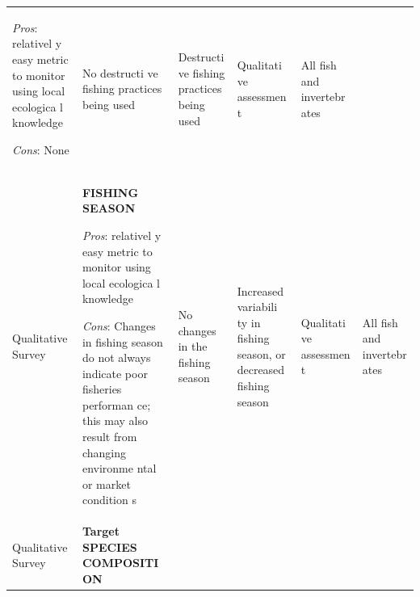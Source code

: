 \documentclass[]{book}
\begin{document}
\begin{longtable}[]{@{}llllll@{}}
\begin{minipage}[t]{0.16\columnwidth}
\emph{Pros}: relativel y easy metric to monitor using local ecologica l
knowledge

\emph{Cons}: None\strut
\end{minipage} & \begin{minipage}[t]{0.16\columnwidth}\raggedright\strut
No destructi ve fishing practices being used\strut
\end{minipage} & \begin{minipage}[t]{0.16\columnwidth}\raggedright\strut
Destructi ve fishing practices being used\strut
\end{minipage} & \begin{minipage}[t]{0.16\columnwidth}\raggedright\strut
Qualitati ve assessmen t\strut
\end{minipage} & \begin{minipage}[t]{0.16\columnwidth}\raggedright\strut
All fish and invertebr ates\strut
\end{minipage}\tabularnewline
\begin{minipage}[t]{0.16\columnwidth}\raggedright\strut
Qualitative Survey\strut
\end{minipage} & \begin{minipage}[t]{0.16\columnwidth}\raggedright\strut
\textbf{FISHING SEASON}

\emph{Pros}: relativel y easy metric to monitor using local ecologica l
knowledge

\emph{Cons}: Changes in fishing season do not always indicate poor
fisheries performan ce; this may also result from changing environme
ntal or market condition s\strut
\end{minipage} & \begin{minipage}[t]{0.16\columnwidth}\raggedright\strut
No changes in the fishing season\strut
\end{minipage} & \begin{minipage}[t]{0.16\columnwidth}\raggedright\strut
Increased variabili ty in fishing season, or decreased fishing
season\strut
\end{minipage} & \begin{minipage}[t]{0.16\columnwidth}\raggedright\strut
Qualitati ve assessmen t\strut
\end{minipage} & \begin{minipage}[t]{0.16\columnwidth}\raggedright\strut
All fish and invertebr ates\strut
\end{minipage}\tabularnewline
\begin{minipage}[t]{0.16\columnwidth}\raggedright\strut
Qualitative Survey\strut
\end{minipage} & \begin{minipage}[t]{0.16\columnwidth}\raggedright\strut
\textbf{Target SPECIES COMPOSITI ON}


\end{minipage}
\end{longtable}
\end{document}
